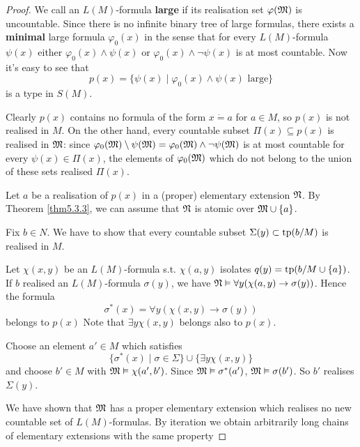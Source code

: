 \documentclass[11pt]{article}
\begin{document}
\begin{proof}
We call an \(L(M)\)-formula \textbf{large} if its realisation set \(\varphi(\mathfrak{M})\) is uncountable. Since there is
no infinite binary tree of large formulas, there exists a \textbf{minimal} large formula
\(\varphi_0(x)\) in the sense that for every \(L(M)\)-formula \(\psi(x)\) either \(\varphi_0(x)\wedge\psi(x)\)
or \(\varphi_0(x)\wedge\neg\psi(x)\) is at most countable. Now it's easy to see that
\begin{equation*}
p(x)=\{\psi(x)\mid\varphi_0(x)\wedge\psi(x)\text{ large}\}
\end{equation*}
is a type in \(S(M)\).

Clearly \(p(x)\) contains no formula of the form \(x\dot{=}a\) for \(a\in M\), so \(p(x)\) is not
realised in \(M\). On the other hand, every countable subset \(\Pi(x)\subseteq p(x)\) is realised
in \(\mathfrak{M}\): since \(\varphi_0(\mathfrak{M})\setminus\psi(\mathfrak{M})=\varphi_0(\mathfrak{M})\wedge\neg\psi(\mathfrak{M})\) is at most countable for every \(\psi(x)\in\Pi(x)\), the
elements of \(\varphi_0(\mathfrak{M})\) which do not belong to the union of these sets realised \(\Pi(x)\).

Let \(a\) be a realisation of \(p(x)\) in a (proper) elementary extension \(\mathfrak{N}\). By Theorem
\ref{thm5.3.3}, we can assume that \(\mathfrak{N}\) is atomic over \(\mathfrak{M}\cup\{a\}\).

Fix \(b\in N\). We have to show that every countable subset \(\Sigma(y)\subset\operatorname{tp}(b/M)\) is realised
in \(M\).

Let \(\chi(x,y)\) be an \(L(M)\)-formula s.t. \(\chi(a,y)\) isolates \(q(y)=\operatorname{tp}(b/M\cup\{a\})\). If \(b\)
realised an \(L(M)\)-formula \(\sigma(y)\), we have \(\mathfrak{N}\vDash\forall y(\chi(a,y)\to\sigma(y))\). Hence the formula
\begin{equation*}
\sigma^*(x)=\forall y(\chi(x,y)\to\sigma(y))
\end{equation*}
belongs to \(p(x)\)
Note that \(\exists y\chi(x,y)\) belongs also to \(p(x)\).

Choose an element \(a'\in M\) which satisfies
\begin{equation*}
\{\sigma^*(x)\mid\sigma\in\Sigma\}\cup\{\exists y\chi(x,y)\}
\end{equation*}
and choose \(b'\in M\) with \(\mathfrak{M}\vDash\chi(a',b')\). Since \(\mathfrak{M}\vDash\sigma^*(a')\), \(\mathfrak{M}\vDash\sigma(b')\). So \(b'\)
realises \(\Sigma(y)\).

We have shown that \(\mathfrak{M}\) has a proper elementary extension which realises no new countable set
of \(L(M)\)-formulas. By iteration we obtain arbitrarily long chains of elementary extensions
with the same property
\end{proof}
\end{document}
